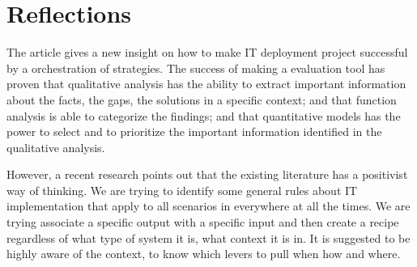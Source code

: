 
\section{Reflections}

The article gives a new insight on how to make IT deployment project successful by a orchestration of strategies. The success of making a evaluation tool has proven that qualitative analysis has the ability to extract important information about the facts, the gaps, the solutions in a specific context; and that function analysis is able to categorize the findings; and that quantitative models has the power to select and to prioritize the important information identified in the qualitative analysis.

However, a recent research points out that the existing literature has a positivist way of thinking. We are trying to identify some general rules about IT implementation that apply to all scenarios in everywhere at all the times. We are trying associate a specific output with a specific input and then create a recipe regardless of what type of system it is, what context it is in. It is suggested to be highly aware of the context, to know which levers to pull when how and where\parencite{6}.